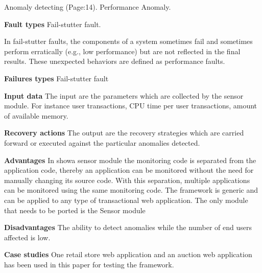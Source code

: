 \begin{compactitem}
Anomaly detecting (Page:14). Performance Anomaly.

\item[\textbf{Fault types}]Fail-stutter fault. 

In fail-stutter faults, the components of a system sometimes fail and sometimes perform erratically (e.g., low performance) but are not reflected in the final results. These unexpected behaviors are defined as performance faults.

\item[\textbf{Failures types}]Fail-stutter fault

\item[\textbf{Input data}] The input are the parameters which are collected by the sensor module. For instance user transactions, CPU time per user transactions, amount of available memory.

\item[\textbf{Recovery actions}]The output are the recovery strategies which are carried forward or executed against the particular anomalies detected.

\item[\textbf{Advantages}] In showa sensor module the monitoring code is separated from the application code, thereby an application can be monitored without the need for manually changing its source code. With this separation, multiple applications can be monitored using the same monitoring code. The framework is generic and can be applied to any type of transactional web application. The only module that needs to be ported is the Sensor module

\item[\textbf{Disadvantages}]The ability to detect anomalies while the number of end users affected is low.

\item[\textbf{Case studies}]One retail store web application and an auction web application has been used in this paper for testing the framework.
\end{compactitem}



